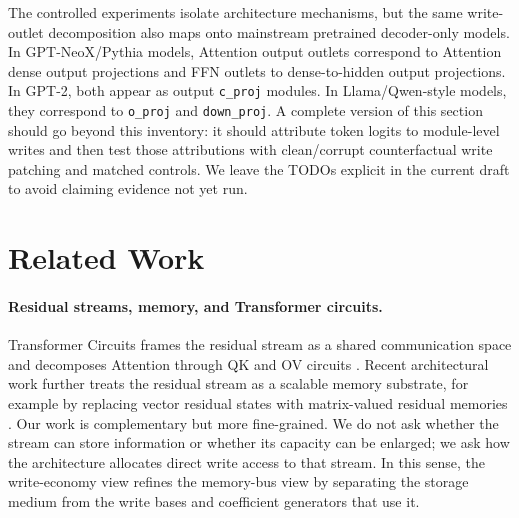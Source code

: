 \documentclass[letterpaper]{article}
\begin{document}
The controlled experiments isolate architecture mechanisms, but the same
write-outlet decomposition also maps onto mainstream pretrained decoder-only
models. In GPT-NeoX/Pythia models, Attention output outlets correspond to
Attention dense output projections and FFN outlets to dense-to-hidden output
projections. In GPT-2, both appear as output \texttt{c\_proj} modules. In
Llama/Qwen-style models, they correspond to \texttt{o\_proj} and
\texttt{down\_proj}. A complete version of this section should go beyond this
inventory: it should attribute token logits to module-level writes and then
test those attributions with clean/corrupt counterfactual write patching and
matched controls. We leave the TODOs explicit in the current draft to avoid
claiming evidence not yet run.


\section{Related Work}

\paragraph{Residual streams, memory, and Transformer circuits.}
Transformer Circuits frames the residual stream as a shared communication space
and decomposes Attention through QK and OV circuits
\citep{elhage2021framework}. Recent architectural work further treats the
residual stream as a scalable memory substrate, for example by replacing vector
residual states with matrix-valued residual memories \citep{mak2025residual}.
Our work is complementary but more fine-grained. We do not ask whether the
stream can store information or whether its capacity can be enlarged; we ask
how the architecture allocates direct write access to that stream. In this
sense, the write-economy view refines the memory-bus view by separating the
storage medium from the write bases and coefficient generators that use it.
\end{document}
